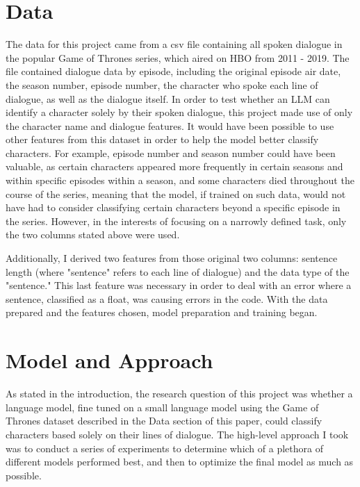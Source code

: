 \documentclass[11pt]{article}
\begin{document}
\section{Data}

The data for this project came from a csv file containing all spoken dialogue in the popular Game of Thrones series, which aired on HBO from 2011 - 2019. The file contained dialogue data by episode, including the original episode air date, the season number, episode number, the character who spoke each line of dialogue, as well as the dialogue itself. In order to test whether an LLM can identify a character solely by their spoken dialogue, this project made use of only the character name and dialogue features. It would have been possible to use other features from this dataset in order to help the model better classify characters. For example, episode number and season number could have been valuable, as certain characters appeared more frequently in certain seasons and within specific episodes within a season, and some characters died throughout the course of the series, meaning that the model, if trained on such data, would not have had to consider classifying certain characters beyond a specific episode in the series. However, in the interests of focusing on a narrowly defined task, only the two columns stated above were used.

Additionally, I derived two features from those original two columns: sentence length (where "sentence" refers to each line of dialogue) and the data type of the "sentence." This last feature was necessary in order to deal with an error where a sentence, classified as a float, was causing errors in the code. With the data prepared and the features chosen, model preparation and training began.

\section{Model and Approach}

As stated in the introduction, the research question of this project was whether a language model, fine tuned  on a small language model using the Game of Thrones dataset described in the Data section of this paper, could classify characters based solely on their lines of dialogue. The high-level approach I took was to conduct a series of experiments to determine which of a plethora of different models performed best, and then to optimize the final model as much as possible.
\end{document}
